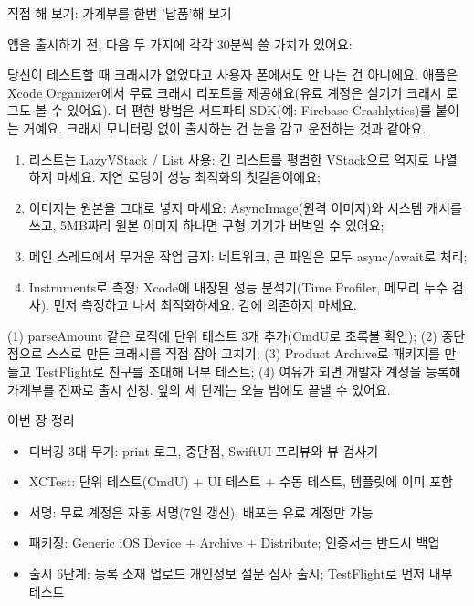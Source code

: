 \begin{tcbpractice}{직접 해 보기: 가계부를 한번 '납품'해 보기}

앱을 출시하기 전, 다음 두 가지에 각각 30분씩 쓸 가치가 있어요:


당신이 테스트할 때 크래시가 없었다고 사용자 폰에서도 안 나는 건 아니에요. 애플은 Xcode Organizer에서 무료 크래시 리포트를 제공해요(유료 계정은 실기기 크래시 로그도 볼 수 있어요). 더 편한 방법은 서드파티 SDK(예: Firebase Crashlytics)를 붙이는 거예요. 크래시 모니터링 없이 출시하는 건 눈을 감고 운전하는 것과 같아요.


\begin{enumerate}
  \item 리스트는 LazyVStack / List 사용: 긴 리스트를 평범한 VStack으로 억지로 나열하지 마세요. 지연 로딩이 성능 최적화의 첫걸음이에요;
  \item 이미지는 원본을 그대로 넣지 마세요: AsyncImage(원격 이미지)와 시스템 캐시를 쓰고, 5MB짜리 원본 이미지 하나면 구형 기기가 버벅일 수 있어요;
  \item 메인 스레드에서 무거운 작업 금지: 네트워크, 큰 파일은 모두 async/await로 처리;
  \item Instruments로 측정: Xcode에 내장된 성능 분석기(Time Profiler, 메모리 누수 검사). 먼저 측정하고 나서 최적화하세요. 감에 의존하지 마세요.
\end{enumerate}

(1) parseAmount 같은 로직에 단위 테스트 3개 추가(CmdU로 초록불 확인); (2) 중단점으로 스스로 만든 크래시를 직접 잡아 고치기; (3) Product Archive로 패키지를 만들고 TestFlight로 친구를 초대해 내부 테스트; (4) 여유가 되면 개발자 계정을 등록해 가계부를 진짜로 출시 신청. 앞의 세 단계는 오늘 밤에도 끝낼 수 있어요.

\end{tcbpractice}

\begin{tcbsummary}{이번 장 정리}
\begin{itemize}
  \item 디버깅 3대 무기: print 로그, 중단점, SwiftUI 프리뷰와 뷰 검사기
  \item XCTest: 단위 테스트(CmdU) + UI 테스트 + 수동 테스트, 템플릿에 이미 포함
  \item 서명: 무료 계정은 자동 서명(7일 갱신); 배포는 유료 계정만 가능
  \item 패키징: Generic iOS Device + Archive + Distribute; 인증서는 반드시 백업
  \item 출시 6단계: 등록 소재 업로드 개인정보 설문 심사 출시; TestFlight로 먼저 내부 테스트
\end{itemize}

\end{tcbsummary}
